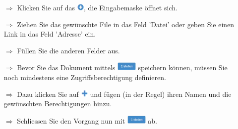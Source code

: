 \documentclass{article}
\begin{document}


\pagebreak
{}

\vspace{\baselineskip}


\begin{multicols}{2}

\begin{tcolorbox}[colback=blue!5,colframe=blue!40!black,title=Dokumente hochladen]
\begin{itemize}
  \item[$\Longrightarrow$] Klicken Sie auf das \includegraphics[height=10pt]{Icons/Plussymbol.png}, die Eingabemaske öffnet sich.
  \item[$\Longrightarrow$] Ziehen Sie das gewünschte File in das Feld 'Datei' oder geben Sie einen Link in das Feld 'Adresse' ein.
  \item[$\Longrightarrow$] Füllen Sie die anderen Felder aus.
  \item[$\Longrightarrow$] Bevor Sie das Dokument mittels \includegraphics[height=12pt]{Icons/B_Erstellen.jpg} speichern können, müssen Sie noch mindestens eine Zugriffsberechtigung definieren. 
	\item[$\Longrightarrow$] Dazu klicken Sie auf \includegraphics[height=10pt]{Icons/Pluszeichen.png} und fügen (in der Regel) ihren Namen und die gewünschten Berechtigungen hinzu.
	\item[$\Longrightarrow$] Schliessen Sie den Vorgang nun mit \includegraphics[height=12pt]{Icons/B_Erstellen.jpg} ab.
\end{itemize}
\end{tcolorbox}



\end{multicols}
\end{document}
